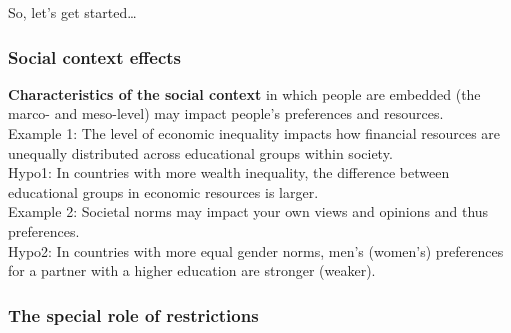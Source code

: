 \documentclass[
]{book}
\begin{document}
So, let's get started\ldots{}

\hypertarget{social-context-effects}{%
\subsubsection*{Social context effects}\label{social-context-effects}}

\textbf{Characteristics of the social context} in which people are embedded (the marco- and meso-level) may impact people's preferences and resources.\\
Example 1: The level of economic inequality impacts how financial resources are unequally distributed across educational groups within society.\\
Hypo1: In countries with more wealth inequality, the difference between educational groups in economic resources is larger.\\
Example 2: Societal norms may impact your own views and opinions and thus preferences.\\
Hypo2: In countries with more equal gender norms, men's (women's) preferences for a partner with a higher education are stronger (weaker).

\hypertarget{the-special-role-of-restrictions}{%
\subsubsection*{The special role of restrictions}\label{the-special-role-of-restrictions}}
\end{document}
